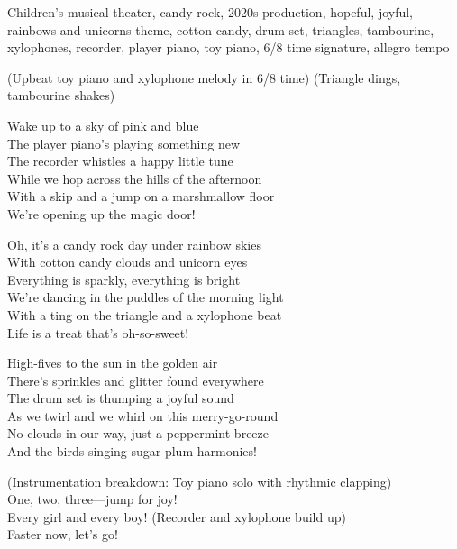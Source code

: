
\begin{notes}
\end{notes}
\begin{style}
Children's musical theater, candy rock, 2020s production, hopeful, joyful, rainbows and unicorns theme, cotton candy, drum set, triangles, tambourine, xylophones, recorder, player piano, toy piano, 6/8 time signature, allegro tempo
\end{style}
\begin{lyrics}
(Upbeat toy piano and xylophone melody in 6/8 time)
(Triangle dings, tambourine shakes)

Wake up to a sky of pink and blue\\
The player piano’s playing something new\\
The recorder whistles a happy little tune\\
While we hop across the hills of the afternoon\\
With a skip and a jump on a marshmallow floor\\
We’re opening up the magic door!

Oh, it’s a candy rock day under rainbow skies\\
With cotton candy clouds and unicorn eyes\\
Everything is sparkly, everything is bright\\
We’re dancing in the puddles of the morning light\\
With a ting on the triangle and a xylophone beat\\
Life is a treat that’s oh-so-sweet!

High-fives to the sun in the golden air\\
There’s sprinkles and glitter found everywhere\\
The drum set is thumping a joyful sound\\
As we twirl and we whirl on this merry-go-round\\
No clouds in our way, just a peppermint breeze\\
And the birds singing sugar-plum harmonies!

(Instrumentation breakdown: Toy piano solo with rhythmic clapping)\\
One, two, three—jump for joy!\\
Every girl and every boy!
(Recorder and xylophone build up)\\
Faster now, let’s go!


\end{lyrics}
